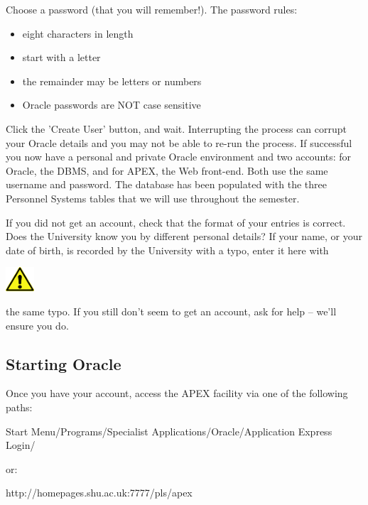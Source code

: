 \begin{center}
\begin{minipage}{14.441cm}
Choose a password (that you will remember!). The password rules:

\begin{itemize}
\item eight characters in length
\item start with a letter
\item the remainder may be letters or numbers
\item Oracle passwords are NOT case sensitive
\end{itemize}
\end{minipage}
\end{center}
Click the 'Create User' button, and wait. Interrupting the process can corrupt your Oracle details and you may not be able to re-run the process. If successful you now have a personal and private Oracle environment and two accounts: for Oracle, the DBMS, and for APEX, the Web front-end. Both use the same username and password. The database has been populated with the three Personnel Systems tables that we will use throughout the semester.

If you did not get an account, check that the format of your entries is correct. Does the University know you by different personal details? If your name, or your date of birth, is recorded by the University with a typo, enter it here with

\begin{center}
  
\includegraphics[width=1.06cm,height=0.903cm]{images/img (2).png}

\end{center}
the same typo. If you still don't seem to get an account, ask for help -- we'll ensure you do.

\clearpage 
\subsection{Starting Oracle}
Once you have your account, access the APEX facility via  one of the following paths:

Start Menu/Programs/Specialist Applications/Oracle/Application Express Login/

or:

http://homepages.shu.ac.uk:7777/pls/apex

